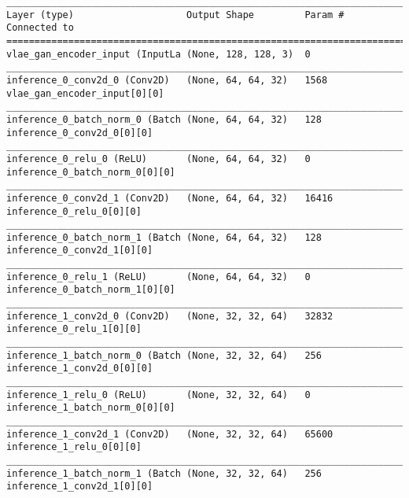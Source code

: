 \begin{lstlisting}[caption={CelebA-\ac{VLAE}-\ac{GAN} Encoder},captionpos=b,basicstyle=\tiny, label={lst:mnist-vlae-gan-encoder}]
__________________________________________________________________________________________________
Layer (type)                    Output Shape         Param #     Connected to
==================================================================================================
vlae_gan_encoder_input (InputLa (None, 128, 128, 3)  0
__________________________________________________________________________________________________
inference_0_conv2d_0 (Conv2D)   (None, 64, 64, 32)   1568        vlae_gan_encoder_input[0][0]
__________________________________________________________________________________________________
inference_0_batch_norm_0 (Batch (None, 64, 64, 32)   128         inference_0_conv2d_0[0][0]
__________________________________________________________________________________________________
inference_0_relu_0 (ReLU)       (None, 64, 64, 32)   0           inference_0_batch_norm_0[0][0]
__________________________________________________________________________________________________
inference_0_conv2d_1 (Conv2D)   (None, 64, 64, 32)   16416       inference_0_relu_0[0][0]
__________________________________________________________________________________________________
inference_0_batch_norm_1 (Batch (None, 64, 64, 32)   128         inference_0_conv2d_1[0][0]
__________________________________________________________________________________________________
inference_0_relu_1 (ReLU)       (None, 64, 64, 32)   0           inference_0_batch_norm_1[0][0]
__________________________________________________________________________________________________
inference_1_conv2d_0 (Conv2D)   (None, 32, 32, 64)   32832       inference_0_relu_1[0][0]
__________________________________________________________________________________________________
inference_1_batch_norm_0 (Batch (None, 32, 32, 64)   256         inference_1_conv2d_0[0][0]
__________________________________________________________________________________________________
inference_1_relu_0 (ReLU)       (None, 32, 32, 64)   0           inference_1_batch_norm_0[0][0]
__________________________________________________________________________________________________
inference_1_conv2d_1 (Conv2D)   (None, 32, 32, 64)   65600       inference_1_relu_0[0][0]
__________________________________________________________________________________________________
inference_1_batch_norm_1 (Batch (None, 32, 32, 64)   256         inference_1_conv2d_1[0][0]

\end{lstlisting}
